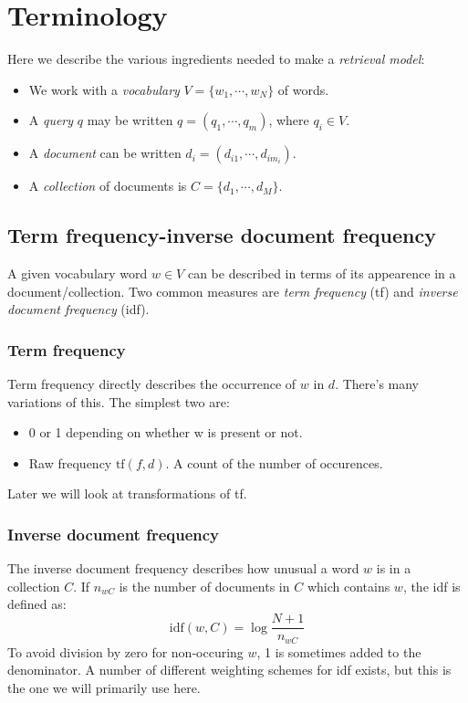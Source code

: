 \documentclass[12pt, a4paper]{article}
\numberwithin{equation}{section}
\begin{document}
\section{Terminology}
Here we describe the various ingredients needed to make a \textit{retrieval model}:
\begin{itemize}
\item We work with a \textit{vocabulary} $V=\{w_1,\cdots,w_N\}$ of words.
\item A \textit{query} $q$ may be written $q=(q_1,\cdots,q_m)$, where $q_i\in V$.
\item A \textit{document} can be written $d_i=(d_{i1},\cdots,d_{im_i})$.
\item A \textit{collection} of documents is $C=\{d_1,\cdots,d_M\}$.
\end{itemize}

\subsection{Term frequency-inverse document frequency}
A given vocabulary word $w\in V$ can be described in terms of its appearence in a document/collection. Two common measures are \textit{term frequency} (tf) and \textit{inverse document frequency} (idf).

\subsubsection{Term frequency}
Term frequency directly describes the occurrence of $w$ in $d$. There's many variations of this. The simplest two are:
\begin{itemize}
\item 0 or 1 depending on whether w is present or not.
\item Raw frequency $\textrm{tf}(f,d)$. A count of the number of occurences.
\end{itemize}
Later we will look at transformations of tf.

\subsubsection{Inverse document frequency}
The inverse document frequency describes how unusual a word $w$ is in a collection $C$. If $n_{wC}$ is the number of documents in $C$ which contains $w$, the idf is defined as:
\begin{equation}
\textrm{idf}(w,C)=\log\frac{N+1}{n_{wC}}
\end{equation}
To avoid division by zero for non-occuring $w$, 1 is sometimes added to the denominator. A number of different weighting schemes for idf exists, but this is the one we will primarily use here.
\end{document}
